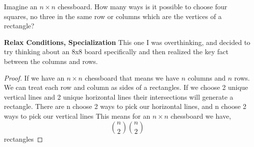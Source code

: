 \documentclass[11pt]{article}
\newenvironment{problem}[2][Problem\!]{\begin{trivlist}
\item[\hskip \labelsep {\bfseries #1}\hskip \labelsep {\bfseries #2}]}{\end{trivlist}}
\begin{document}
\begin{tcolorbox}
    \begin{problem} {OC | 11/01 | 68}
        Imagine an $n \times n$ chessboard. How many ways is it possible to choose four squares, no three in the same row or columns which are the vertices of a rectangle?
    \end{problem}
    \textbf{Relax Conditions, Specialization} This one I was overthinking, and decided to try thinking about an 8x8 board specifically and then realized the key fact between the columns and rows.
\end{tcolorbox}
\begin{proof}
    If we have an $n\times n$ chessboard that means we have $n$ columns and $n$ rows. We can treat each row and column as sides of a rectangles. If we choose 2 unique vertical lines and 2 unique horizontal lines their intersections will generate a rectangle. There are n choose 2 ways to pick our horizontal lines, and n choose 2 ways to pick our vertical lines This means for an $n \times n$ chessboard we have, 
    \[\binom{n}{2}\binom{n}{2}\]
    rectangles
\end{proof}
\end{document}
